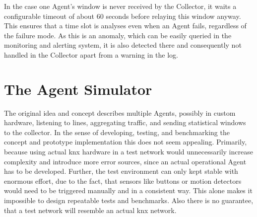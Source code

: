 In the case one Agent's window is never received by the Collector, it waits a configurable timeout of about $60$ seconds before relaying this window anyway. This ensures that a time slot is analyses even when an Agent fails, regardless of the failure mode. As this is an anomaly, which can be easily queried in the monitoring and alerting system, it is also detected there and consequently not handled in the Collector apart from a warning in the log.

\newpage
\section{The Agent Simulator}
\label{sec:impl:agent}

\begin{comment}
\begin{itemize}
	\item simulates multiple agents based of one log containing telegram in raw \gls{baos} format. cf. Appendix~\todo{add log sample in appendix}
	\item log must be in chronological order
	\item utilizes own parser implementation \url{https://github.com/FreakyBytes/BaosKnxParser}
	\item different agents can be simulated by applying filter rules to log stream, defining, what each agent "can see"
	\item is supposed to replace actual agents during development
		\subitem repeatable data
		\subitem easy/fast setup
		\subitem log-time much faster than real-time
		\subitem load testing possible
	\item reads in individual pack
	\item filters according to agent filter rules
	\item updates agent-specific window data model
	\item if window length/timeout (cf. Section~\ref{sec:concept:agent}) is exceeded in log-time, windows are submitted to \gls{amqp} message broker (cf. Figure~\ref{fig:concept:architecture})
	\item runs until log is fully red, or maximum packets to parse are exceeded, or defined end timestamp is reached
\end{itemize}
\end{comment}

The original idea and concept describes multiple Agents, possibly in custom hardware, listening to lines, aggregating traffic, and sending statistical windows to the collector.
In the sense of developing, testing, and benchmarking the concept and prototype implementation this does not seem appealing. Primarily, because using actual \gls{knx} hardware in a test network would unnecessarily increase complexity and introduce more error sources, since an actual operational Agent has to be developed.
Further, the test environment can only kept stable with enormous effort, due to the fact, that sensors like buttons or motion detectors would need to be triggered manually and in a consistent way. This alone makes it impossible to design repeatable tests and benchmarks.
Also there is no guarantee, that a test network will resemble an actual \gls{knx} network.

